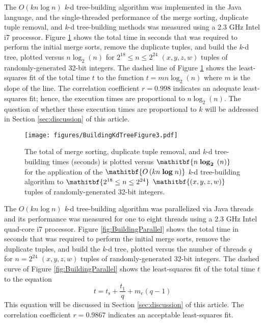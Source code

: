 \documentclass{sig-alternate}
\begin{document}
The $O\left(kn \log n\right)$ \emph{k}-d tree-building algorithm was implemented in the Java language, and the single-threaded performance of the merge sorting, duplicate tuple removal, and \emph{k}-d tree-building methods was measured using a 2.3 GHz Intel i7 processor.  Figure \ref{fig:BuildingTime} shows the total time in seconds that was required to perform the initial merge sorts, remove the duplicate tuples, and build the \emph{k}-d tree, plotted versus $n \log_2 \left(n\right)$ for $2^{18} \le n \le 2^{24}$ $\left(x,y,z,w\right)$ tuples of randomly-generated 32-bit integers. The dashed line of Figure \ref{fig:BuildingTime} shows the least-squares fit of the total time $t$ to the function $t = mn \log_2 \left(n\right)$ where $m$ is the slope of the line.  The correlation coefficient $r = 0.998$ indicates an adequate least-squares fit; hence, the execution times are proportional to $n \log_2 \left(n\right)$.  The question of whether these execution times are proportional to $k$ will be addressed in Section \ref{sec:discussion} of this article.

\begin{figure}[h]
\centering
\centerline{\texttt{[image: figures/BuildingKdTreeFigure3.pdf]}}
\caption{The total of merge sorting, duplicate tuple removal, and \emph{k}-d tree-building times (seconds) is plotted versus $\mathitbf{n \; \boldsymbol{\log_2} \; \left(n\right)}$ for the application of the $\mathitbf{O\left(kn \; \boldsymbol{\log} \; n\right)}$ \emph{k}-d tree-building algorithm to $\mathitbf{2^{18} \le n \le 2^{24}}$ $\mathitbf{\left(x,y,z,w\right)}$ tuples of randomly-generated 32-bit integers.}
\label{fig:BuildingTime}
\end{figure}

The $O\left(kn \log n\right)$ \emph{k}-d tree-building algorithm was parallelized via Java threads and its performance was measured for one to eight threads using a 2.3 GHz Intel quad-core i7 processor.  Figure \ref{fig:BuildingParallel} shows the total time in seconds that was required to perform the initial merge sorts, remove the duplicate tuples, and build the \emph{k}-d tree, plotted versus the number of threads $q$ for $n=2^{24}$ $\left(x,y,z,w\right)$ tuples of randomly-generated 32-bit integers. The dashed curve of Figure \ref{fig:BuildingParallel} shows the least-squares fit of the total time $t$ to the equation
\begin{equation}
t =  t_\mathrm{s} + \frac{t_1}{q} + m_\mathrm{c}\left(q - 1\right)
\label{eq:gunther}
\end{equation}
This equation will be discussed in Section \ref{sec:discussion} of this article.  The correlation coefficient $r=0.9867$ indicates an acceptable least-squares fit.
\end{document}
